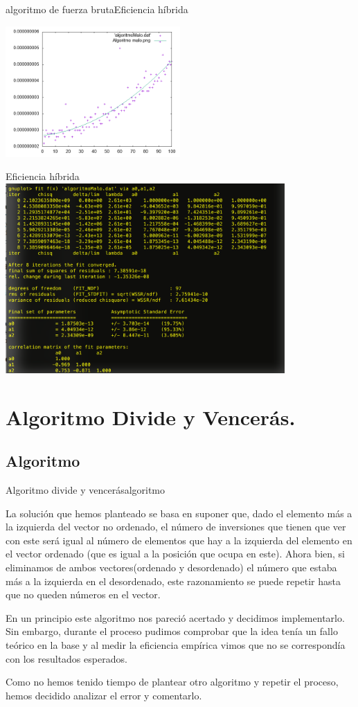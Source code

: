 \documentclass{beamer}
\begin{document}
\begin{frame}{algoritmo de fuerza bruta}{Eficiencia híbrida}

	\includegraphics[width=0.5\textwidth]{algoritmoMaloAjuste.png}
\end{frame}
\begin{frame}{Eficiencia híbrida}
	\includegraphics[width=0.8\textwidth]{maloajuste}

\section{Algoritmo Divide y Vencerás.}
\end{frame}
\subsection{Algoritmo}

\begin{frame}{Algoritmo divide y vencerás}{algoritmo}

La solución que hemos planteado se basa en suponer que, dado el elemento más a la izquierda del vector no ordenado, el número de inversiones que tienen que ver con este será igual al número de elementos que hay a la izquierda del elemento en el vector ordenado (que es igual a la posición que ocupa en este). Ahora bien, si eliminamos de ambos vectores(ordenado y desordenado) el número que estaba más a la izquierda en el desordenado, este razonamiento se puede repetir hasta que no queden números en el vector.

En un principio este algoritmo nos pareció acertado y decidimos implementarlo. Sin embargo, durante el proceso pudimos comprobar que la idea tenía un fallo teórico en la base y al medir la eficiencia empírica vimos que no se correspondía con los resultados esperados.

Como no hemos tenido tiempo de plantear otro algoritmo y repetir el proceso, hemos decidido analizar el error y comentarlo.
\end{frame}
\end{document}
